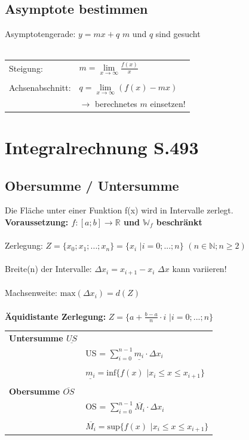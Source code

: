 		\subsection{Asymptote bestimmen}
		Asymptotengerade: $y = mx + q$		\qquad $m$ und $q$ sind gesucht \\
		\\
		\begin{tabular}{ll}
		Steigung: & $m = \lim \limits_{x \rightarrow \infty} \frac{f(x)}{x}$ \\
		\\
		Achsenabschnitt: & $q = \lim \limits_{x \rightarrow \infty} (f(x) - mx)$ \\
		& $\rightarrow$ berechnetes $m$ einsetzen! \\
		\end{tabular}
		
		
		
		
		\section{Integralrechnung S.493}
		
		\subsection{Obersumme / Untersumme}
		Die Fläche unter einer Funktion f(x) wird in Intervalle zerlegt.\\
		\textbf{Voraussetzung: $f: [a;b] \rightarrow \mathbb{R}$ und $\mathbb{W}_f$ beschränkt} \\
		\\
		Zerlegung: $Z = \lbrace x_0; x_1; ... ; x_n \rbrace = \lbrace x_i$  $\vert i=0; ... ; n \rbrace$ \quad $(n \in \mathbb{N}; n \geq 2)$ \\
		\\
		Breite(n) der Intervalle: $\Delta x_i = x_{i+1} - x_i$ \quad $\Delta x$ kann variieren!\\
		\\
		Machsenweite: $\mathrm{max}(\Delta x_i) = d(Z)$  \\
		\\
		\textbf{Äquidistante Zerlegung:} $Z = \lbrace a + \frac{b-a}{n} \cdot i $ $\vert i=0; ...; n \rbrace$ \\
		
		\begin{tabular}{ll}
		\textbf{Untersumme $\underline{US}$} & \\
		& US = $\sum \limits_{i=0}^{n-1} \underline{m_i} \cdot \Delta x_i$ \\
		\\
		& $\underline{m_i} = \mathrm{inf} \lbrace f(x)$ $\vert x_i \leq x \leq x_{i+1} \rbrace$ \\
		\\
		\textbf{Obersumme $\overline{OS}$} &	 \\
		& OS = $\sum \limits_{i=0}^{n-1} \overline{M_i} \cdot \Delta x_i$ \\
		\\
		& $\overline{M_i} = \mathrm{sup} \lbrace f(x)$ $\vert x_i \leq x \leq x_{i+1} \rbrace$ \\
		\end{tabular}
		
